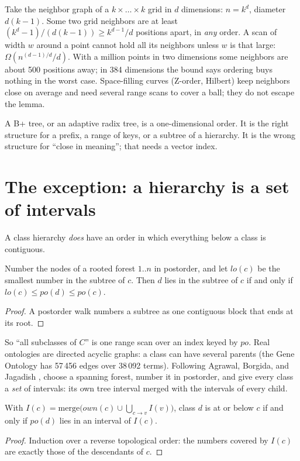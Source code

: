 Take the neighbor graph of a $k \times \dots \times k$ grid in $d$ dimensions:
$n = k^d$, diameter $d(k-1)$. Some two grid neighbors are at least
$(k^d-1)/(d(k-1)) \ge k^{d-1}/d$ positions apart, in \emph{any} order. A scan of
width $w$ around a point cannot hold all its neighbors unless $w$ is that large:
$\Omega(n^{(d-1)/d}/d)$. With a million points in two dimensions some neighbors
are about 500 positions away; in 384 dimensions the bound says ordering buys
nothing in the worst case. Space-filling curves (Z-order, Hilbert) keep
neighbors close on average and need several range scans to cover a ball; they do
not escape the lemma.

\begin{keyidea}
A B+ tree, or an adaptive radix tree, is a one-dimensional order. It is the
right structure for a prefix, a range of keys, or a subtree of a hierarchy. It is
the wrong structure for ``close in meaning''; that needs a vector index.
\end{keyidea}

\section{The exception: a hierarchy is a set of intervals}

A class hierarchy \emph{does} have an order in which everything below a class
is contiguous.

\begin{lemma}[Trees]\label{lem:tree}
Number the nodes of a rooted forest $1..n$ in postorder, and let $\mathit{lo}(c)$
be the smallest number in the subtree of $c$. Then $d$ lies in the subtree of $c$
if and only if $\mathit{lo}(c) \le \mathit{po}(d) \le \mathit{po}(c)$.
\end{lemma}
\begin{proof}
A postorder walk numbers a subtree as one contiguous block that ends at its
root.
\end{proof}

So ``all subclasses of $C$'' is one range scan over an index keyed by
$\mathit{po}$. Real ontologies are directed acyclic graphs: a class can have
several parents (the Gene Ontology has 57\,456  edges over 38\,092
terms). Following Agrawal, Borgida, and Jagadish \cite{agrawal1989}, choose a
spanning forest, number it in postorder, and give every class a \emph{set} of
intervals: its own tree interval merged with the intervals of every child.

\begin{lemma}\label{lem:sets}
With $I(c) = \mathrm{merge}\big(\mathit{own}(c) \cup \bigcup_{c \to v} I(v)\big)$,
class $d$ is at or below $c$ if and only if $\mathit{po}(d)$ lies in an interval
of $I(c)$.
\end{lemma}
\begin{proof}
Induction over a reverse topological order: the numbers covered by $I(c)$ are
exactly those of the descendants of $c$.
\end{proof}

